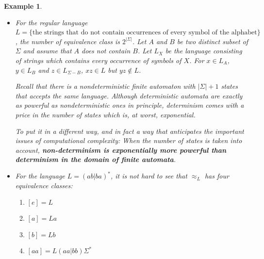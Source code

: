 \documentclass[aps,pra,onecolumn,notitlepage,superscriptaddress]{revtex4-1}
\newtheorem{exa}{Example}
\begin{document}
    \begin{exa}
        \begin{itemize}
            \item For the regular language $L = \{ \text{the strings that do not contain occurrences of every symbol of the alphabet} \}$, the number of equivalence class is $2^{|\Sigma|}$. Let $A$ and $B$ be two distinct subset of $\Sigma$ and assume that $A$ does not contain $B$. Let $L_X$ be the language consisting of strings which contains every occurrence of symbols of $X$. For $x \in L_A$, $y \in L_B$ and $z \in L_{\Sigma - B}$, $xz \in L$ but $yz \notin L$.
            
            Recall that there is a nondeterministic finite automaton with $|\Sigma| + 1$ states that accepts the same language. Although deterministic automata are exactly as powerful as nondeterministic ones in principle, determinism comes with a price in the number of states which is, at worst, exponential. 
            
            To put it in a different way, and in fact a way that anticipates the important issues of computational complexity: When the number of states is taken into account, \textbf{non-determinism is exponentially more powerful than determinism in the domain of finite automata}.
            \item For the language $L = (ab | ba)^*$, it is not hard to see that $\approx_L$ has four equivalence classes:
            \begin{enumerate}
                \item $[e] = L$
                \item $[a] = La$
                \item $[b] = Lb$
                \item $[aa] = L(aa|bb)\Sigma^*$
            \end{enumerate}
        

\end{itemize}
\end{exa}
\end{document}
